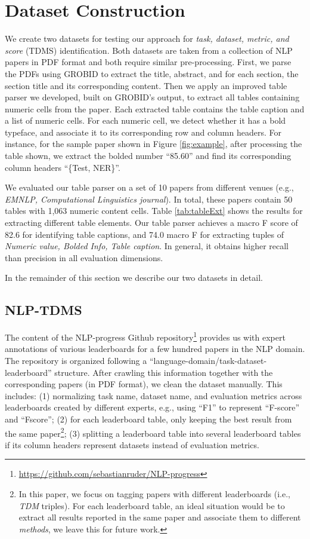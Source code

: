 \documentclass[11pt,a4paper]{article}
\begin{document}
\section{Dataset Construction}
\label{sec:datasets}


We create two datasets for testing our approach for \emph{task, dataset, metric, and score} (TDMS) identification.
Both datasets are taken from a collection of NLP papers in PDF format and both require similar pre-processing.
First, we parse the PDFs using GROBID \cite{gorbid} to extract the title, abstract, and for each section, the section title and its corresponding content. 
Then we apply an improved table parser we developed, built on GROBID's output, to extract all tables containing numeric cells from the paper.
Each extracted table contains the table caption and a list of numeric cells. For each numeric cell, we detect whether it has a bold typeface, and associate it to its corresponding row and column headers. For instance, for the sample paper shown in Figure \ref{fig:example}, after processing the table shown, we extract the bolded number ``85.60'' and find its corresponding column headers ``\{Test, NER\}''.

We evaluated our table parser on a set of 10 papers from different venues (e.g., \emph{EMNLP, Computational Linguistics journal}).
In total, these papers contain 50 tables with 1,063 numeric content cells. Table \ref{tab:tableExt} shows the results for extracting different table elements.  Our table parser achieves a macro F score of 82.6 for identifying table captions, and 74.0 macro F  for extracting tuples of \emph{Numeric value, Bolded Info, Table caption}. In general, it obtains higher recall than precision in all evaluation dimensions.

In the remainder of this section we describe our two datasets in
detail.




\subsection{NLP-TDMS}
\label{sec:ds1}
The content of the NLP-progress Github repository\footnote{\url{https://github.com/sebastianruder/NLP-progress}} provides us with expert annotations of various leaderboards for a few hundred papers in the NLP domain. The repository is organized following a ``language-domain/task-dataset-leaderboard'' structure. After crawling this information together with the corresponding papers (in PDF format), we clean the dataset manually. This includes: (1) normalizing task name, dataset name, and evaluation metrics across  leaderboards created by different experts, e.g., using ``F1'' to represent ``F-score'' and ``Fscore''; (2) for each leaderboard table, only keeping the best result from the same paper\footnote{In this paper, we focus on tagging papers with different leaderboards (i.e., \emph{TDM} triples). For each leaderboard table, an ideal situation would be to extract all results reported in the same paper and associate them to different \emph{methods}, we leave this for future work.}; (3) splitting a leaderboard table into several leaderboard tables 
if its column headers represent datasets instead of evaluation metrics. 
\end{document}
